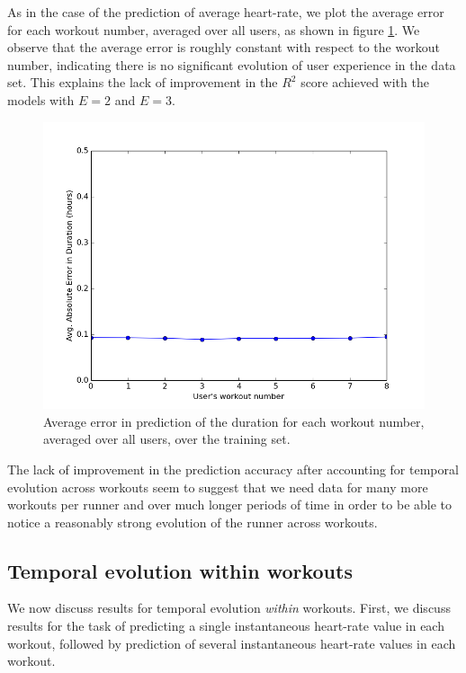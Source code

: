 \documentclass{acm_proc_article-sp}
\begin{document}
As in the case of the prediction of average heart-rate, we plot the average error for each workout number, averaged over all users, as shown in figure \ref{figDurationAvgErrorE1}. We observe that the average error is roughly constant with respect to the workout number, indicating there is no significant evolution of user experience in the data set. This explains the lack of improvement in the $R^2$ score achieved with the models with $E = 2$ and $E = 3$.

\begin{figure}[h]
\centering
\includegraphics[scale=0.35]{../src/plots/duration_error_vs_workout_E1}
\caption{\label{figDurationAvgErrorE1}  Average error in prediction of the duration for each workout number, averaged over all users, over the training set.}
\end{figure}

The lack of improvement in the prediction accuracy after accounting for temporal evolution across workouts seem to suggest that we need data for many more workouts per runner and over much longer periods of time in order to be able to notice a reasonably strong evolution of the runner across workouts.

\subsection{Temporal evolution within workouts}

We now discuss results for temporal evolution \emph{within} workouts. First, we discuss results for the task of predicting a single instantaneous heart-rate value in each workout, followed by prediction of several instantaneous heart-rate values in each workout.
\end{document}
